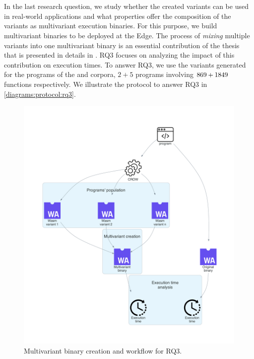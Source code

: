 
\section{\rqthree}
\label{rq3:method}

\newcommand{\mewe}{MEWE\xspace}

In the last research question, we study whether the created variants can be used in real-world applications and what properties offer the composition of the variants as multivariant execution binaries. For this purpose, we build multivariant binaries to be deployed at the Edge. The process of \emph{mixing} multiple variants into one multivariant binary is an essential contribution of the thesis that is presented in details in \citationneeded. RQ3 focuses on analyzing the impact of this contribution on execution times. To answer RQ3, we use the variants generated for the programs of the \corpussodium and \corpusqrcode corpora, $2 + 5$ programs involving $ 869 + 1849$ functions respectively. We illustrate the protocol to answer RQ3 in \autoref{diagrams:protocol:rq3}.


\begin{figure}[h]
    \centering
    \includegraphics[width=\linewidth]{diagrams/Rq3.pdf}
    \caption{Multivariant binary creation and workflow for RQ3.}
    \label{diagrams:protocol:rq3}
\end{figure}

